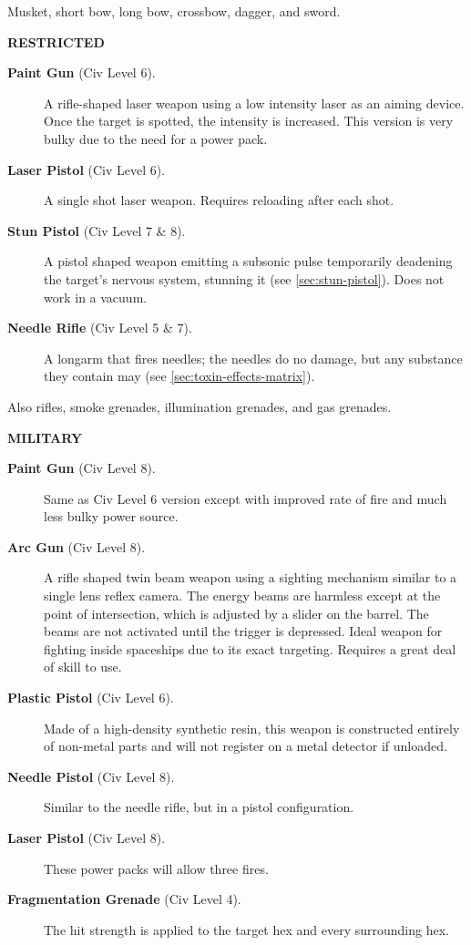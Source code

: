 Musket, short bow, long bow, crossbow, dagger, and sword. 


\medskip

\noindent\textbf{RESTRICTED}
\begin{description}
\item[\hypertarget{tag:cl6-paintgun}{\textbf{Paint Gun} (Civ Level 6)}.] A rifle-shaped laser weapon using a
  low intensity laser as an aiming device. Once the target is spotted,
  the intensity is increased. This version is very bulky due to the
  need for a power pack. 
\item[\hypertarget{tag:cl6-laser}{\textbf{Laser Pistol} (Civ Level 6)}.] A single shot laser weapon.
  Requires reloading after each shot. 
\item[\textbf{Stun Pistol} (Civ Level 7 \& 8).] A pistol shaped weapon emitting
  a subsonic pulse temporarily deadening the target's nervous system,
  stunning it (see \ref{sec:stun-pistol}). Does not work in a vacuum. 
\item[\textbf{Needle Rifle} (Civ Level 5 \& 7).] A longarm that fires needles;
  the needles do no damage, but any substance they contain may (see
  \ref{sec:toxin-effects-matrix}).
\end{description}

Also rifles, smoke grenades, illumination grenades, and gas grenades.

\medskip

\noindent\textbf{MILITARY}
\begin{description}
\item[\hypertarget{tag:cl8-paintgun}{\textbf{Paint Gun} (Civ Level 8)}.] Same as Civ Level 6 version except
  with improved rate of fire and much less bulky power source. 
\item[\hypertarget{tag:arcgun}{\textbf{Arc Gun} (Civ Level 8)}.] A rifle shaped twin beam weapon using a
  sighting mechanism similar to a single lens reflex camera. The
  energy beams are harmless except at the point of intersection, which
  is adjusted by a slider on the barrel. The beams are not activated
  until the trigger is depressed. Ideal weapon for fighting inside
  spaceships due to its exact targeting. Requires a great deal of
  skill to use. 
\item[\textbf{\hypertarget{tag:plastic-pistol}{Plastic Pistol}} (Civ Level 6).] Made of a high-density synthetic
  resin, this weapon is constructed entirely of non-metal parts and
  will not register on a metal detector if unloaded.
\item[\textbf{Needle Pistol} (Civ Level 8).] Similar to the needle rifle, but
  in a pistol configuration.
\item[\hypertarget{tag:cl8-laser}{\textbf{Laser Pistol} (Civ Level 8)}.] These power packs will allow three
  fires.
\item[\textbf{Fragmentation Grenade} (Civ Level 4).] The hit strength is
  applied to the target hex and every surrounding hex.
\end{description}

